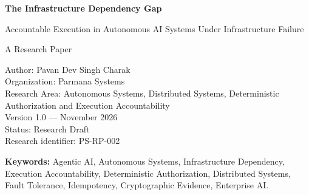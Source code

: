 \documentclass[11pt,a4paper]{article}
\begin{document}
\begin{titlepage}
  \centering
  \vspace*{3cm}
  {\LARGE\bfseries The Infrastructure Dependency Gap\par}
  \vspace{0.6cm}
  {\Large Accountable Execution in Autonomous AI Systems Under Infrastructure Failure\par}
  \vspace{1.2cm}
  {\large A Research Paper\par}
  \vspace{1.5cm}
  {\normalsize
  Author: Pavan Dev Singh Charak\\[0.3em]
  Organization: Parmana Systems\\[0.3em]
  Research Area: Autonomous Systems, Distributed Systems, Deterministic Authorization and Execution Accountability\\[0.3em]
  Version 1.0 --- November 2026\\[0.3em]
  Status: Research Draft\\[0.3em]
  Research identifier: PS-RP-002}
  \vfill
  \begin{minipage}{0.85\textwidth}
    \small\textbf{Keywords:} Agentic AI, Autonomous Systems, Infrastructure Dependency, Execution Accountability, Deterministic Authorization, Distributed Systems, Fault Tolerance, Idempotency, Cryptographic Evidence, Enterprise AI.
  \end{minipage}
  \vspace{1cm}
\end{titlepage}
\end{document}

